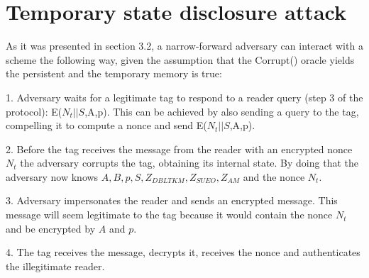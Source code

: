 \section{Temporary state disclosure attack}

    As it was presented in section 3.2, a narrow-forward adversary can interact with a scheme the following way, given the assumption that
    the Corrupt() oracle yields the persistent and the temporary memory is true:

    1. Adversary waits for a legitimate tag to respond to a reader query (step 3 of the protocol): E($N_t||S$,A,p).
    This can be achieved by also sending a query to the tag, compelling it to compute a nonce and send E($N_t||S$,A,p).

    2. Before the tag receives the message from the reader with an encrypted nonce $N_t$ the adversary corrupts the tag, obtaining
    its internal state. By doing that the adversary now knows $A, B, p, S, Z_{DBLTKM}, Z_{SUEO}, Z_{AM}$ and the nonce $N_t$.
    
    3. Adversary impersonates the reader and sends an encrypted message. This message will seem legitimate to the tag because it would
    contain the nonce $N_t$ and be encrypted by $A$ and $p$.

    4. The tag receives the message, decrypts it, receives the nonce and authenticates the illegitimate reader.

